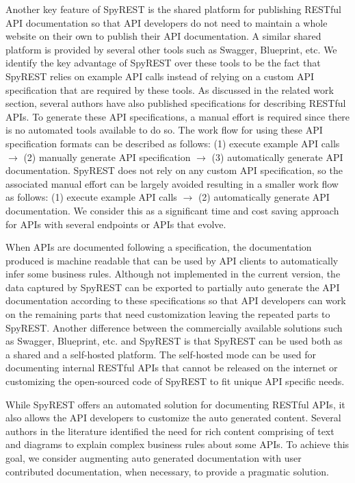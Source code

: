 \documentclass[conference]{IEEEtran}
\begin{document}
Another key feature of SpyREST is the shared platform for publishing RESTful API documentation so that API developers do not need to maintain a whole website on their own to publish their API documentation. A similar shared platform is provided by several other tools such as Swagger, Blueprint, etc. We identify the key advantage of SpyREST over these tools to be the fact that SpyREST relies on example API calls instead of relying on a custom API specification that are required by these tools. As discussed in the related work section, several authors have also published specifications for describing RESTful APIs. To generate these API specifications, a manual effort is required since there is no automated tools available to do so. The work flow for using these API specification formats can be described as follows: (1) execute example API calls $\longrightarrow$ (2) manually generate API specification $\longrightarrow$ (3) automatically generate API documentation. SpyREST does not rely on any custom API specification, so the associated manual effort can be largely avoided resulting in a smaller work flow as follows: (1) execute example API calls $\longrightarrow$ (2) automatically generate API documentation. We consider this as a significant time and cost saving approach for APIs with several endpoints or APIs that evolve.

When APIs are documented following a specification, the documentation produced is machine readable that can be used by API clients to automatically infer some business rules. Although not implemented in the current version, the data captured by SpyREST can be exported to partially auto generate the API documentation according to these specifications so that API developers can work on the remaining parts that need customization leaving the repeated parts to SpyREST. Another difference between the commercially available solutions such as Swagger, Blueprint, etc. and SpyREST is that SpyREST can be used both as a shared and a self-hosted platform. The self-hosted mode can be used for documenting internal RESTful APIs that cannot be released on the internet or customizing the open-sourced code of SpyREST to fit unique API specific needs.

While SpyREST offers an automated solution for documenting RESTful APIs, it also allows the API developers to customize the auto generated content. Several authors in the literature identified the need for rich content comprising of text and diagrams to explain complex business rules about some APIs. To achieve this goal, we consider augmenting auto generated documentation with user contributed documentation, when necessary, to provide a pragmatic solution.
\end{document}
